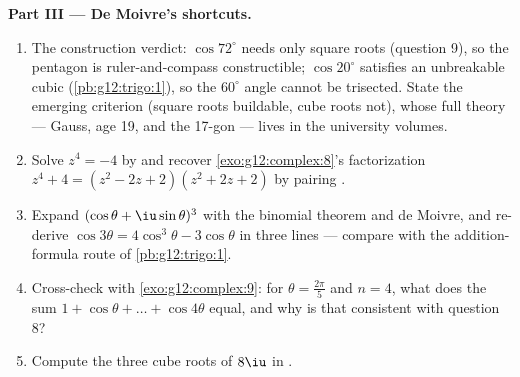 \begin{problem}
\medskip
\noindent\textbf{Part III --- De Moivre's shortcuts.}
\begin{enumerate}[resume]
  \item The construction verdict: $\cos 72^\circ$ needs only
        square roots (question 9), so the pentagon is
        ruler-and-compass constructible; $\cos 20^\circ$
        satisfies an unbreakable cubic
        (\cref{pb:g12:trigo:1}), so the $60^\circ$ angle cannot
        be trisected. State the emerging criterion (square
        roots buildable, cube roots not), whose full theory ---
        Gauss, age 19, and the 17-gon --- lives in the
        university volumes.
  \item Solve $z^4 = -4$ by  and recover
        \cref{exo:g12:complex:8}'s factorization
        $z^4 + 4 = (z^2 - 2z + 2)(z^2 + 2z + 2)$ by pairing
         .
  \item Expand $(\cos\theta + \iu\sin\theta)^3$ with the
        binomial theorem and de Moivre, and re-derive
        $\cos 3\theta = 4\cos^3\theta - 3\cos\theta$ in three
        lines --- compare with the addition-formula route of
        \cref{pb:g12:trigo:1}.
  \item Cross-check with \cref{exo:g12:complex:9}: for
        $\theta = \frac{2\pi}{5}$ and $n = 4$, what does the
        sum $1 + \cos\theta + \dots + \cos 4\theta$ equal, and
        why is that consistent with question 8?
  \item Compute the three cube roots of $8\iu$ in .
\end{enumerate}


\end{problem}
